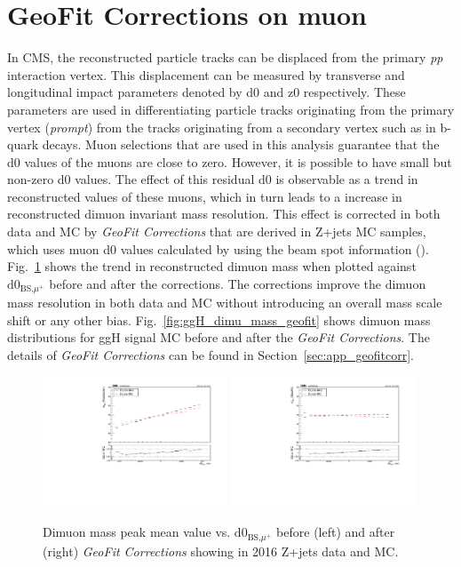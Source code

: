 \section{GeoFit Corrections on muon \pt}
\label{sec:geofitcorr}
In CMS, the reconstructed particle tracks can be displaced from the primary \textit{pp} interaction vertex. This displacement can be measured by transverse and longitudinal impact parameters denoted by d0 and z0 respectively. These parameters are used in differentiating particle tracks originating from the primary vertex (\textit{prompt}) from the tracks originating from a secondary vertex such as in b-quark decays. Muon selections that are used in this analysis guarantee that the d0 values of the muons are close to zero. However, it is possible to have small but non-zero d0 values. The effect of this residual d0 is observable as a trend in reconstructed \pt values of these muons, which in turn leads to a increase in reconstructed dimuon invariant mass resolution. This effect is corrected in both data and MC by \textit{GeoFit Corrections} that are derived in Z+jets MC samples, which uses muon d0 values calculated by using the beam spot information (\dzeroBS). Fig.~\ref{fig:dimu_mass_vs_d0} shows the trend in reconstructed dimuon mass when plotted against $\text{d0}_{\text{BS,}\mu^+}$ before and after the corrections. The corrections improve the dimuon mass resolution in both data and MC without introducing an overall mass scale shift or any other bias. Fig.~\ref{fig:ggH_dimu_mass_geofit} shows dimuon mass distributions for ggH signal MC before and after the \textit{GeoFit Corrections}. The details of \textit{GeoFit Corrections} can be found in Section~\ref{sec:app_geofitcorr}.


\begin{figure}[h!]
    \centering
    \includegraphics[width=0.49\textwidth]{images_geofit/dimu_mass_vs_d0BS_Roch.pdf}
    \includegraphics[width=0.49\textwidth]{images_geofit/dimu_mass_vs_d0BS_geofit.pdf}
    \caption{Dimuon mass peak mean value vs. $\text{d0}_{\text{BS,}\mu^+}$ before (left) and after (right) \textit{GeoFit Corrections} showing in 2016 Z+jets data and MC.}
    \label{fig:dimu_mass_vs_d0}
\end{figure}


